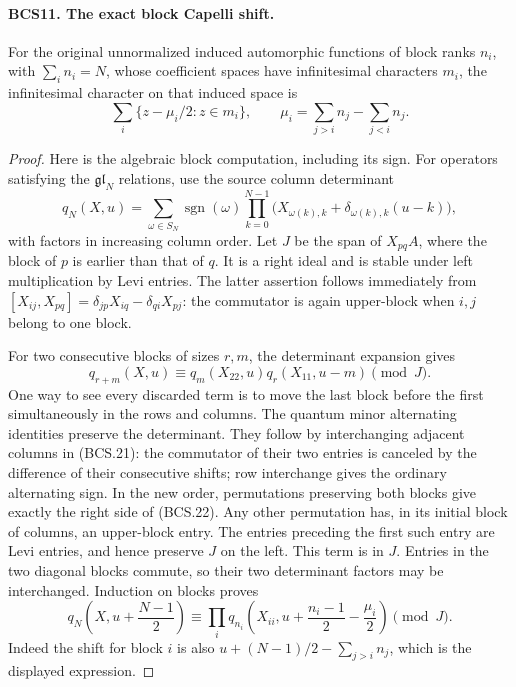 \paragraph{BCS11. The exact block Capelli shift.}
\label{claim:BCS11}
For the original unnormalized induced automorphic functions of block
ranks \(n_i\), with \(\sum_i n_i=N\), whose coefficient spaces
have infinitesimal characters \(m_i\), the infinitesimal character
on that induced space is
\[
       \sum_i\{z-\mu_i/2:z\in m_i\},\qquad
       \mu_i=\sum_{j>i}n_j-\sum_{j<i}n_j.
 \tag{BCS.20}
\]
\begin{proof}
Here is the algebraic block computation, including its sign.
For operators satisfying the \(\mathfrak{gl}_N\) relations, use
the source column determinant
\[
 q_N(X,u)=\sum_{\omega\in S_N}\operatorname{sgn}(\omega)
       \prod_{k=0}^{N-1}
       \bigl(X_{\omega(k),k}+\delta_{\omega(k),k}(u-k)\bigr),
 \tag{BCS.21}
\]
with factors in increasing column order.  Let \(J\) be the span
of \(X_{pq}A\), where the block of \(p\) is earlier than that of
\(q\).  It is a right ideal and is stable under left multiplication
by Levi entries.  The latter assertion follows immediately from
\([X_{ij},X_{pq}]=\delta_{jp}X_{iq}-\delta_{qi}X_{pj}\): the
commutator is again upper-block when \(i,j\) belong to one block.

For two consecutive blocks of sizes \(r,m\), the determinant
expansion gives
\[
 q_{r+m}(X,u)\equiv
       q_m(X_{22},u)q_r(X_{11},u-m)\pmod J.
 \tag{BCS.22}
\]
One way to see every discarded term is to move the last block before
the first simultaneously in the rows and columns.  The quantum
minor alternating identities preserve the determinant.  They follow
by interchanging adjacent columns in (BCS.21): the commutator of
their two entries is canceled by the difference of their consecutive
shifts; row interchange gives the ordinary alternating sign.  In the
new order, permutations preserving both blocks give exactly the
right side of (BCS.22).  Any other permutation has, in its initial
block of columns, an upper-block entry.  The entries preceding the
first such entry are Levi entries, and hence preserve \(J\) on the
left.  This term is in \(J\).  Entries in the two diagonal blocks
commute, so their two determinant factors may be interchanged.
Induction on blocks proves
\[
 q_N\!\left(X,u+\frac{N-1}{2}\right)
 \equiv\prod_i q_{n_i}\!\left(X_{ii},
           u+\frac{n_i-1}{2}-\frac{\mu_i}{2}\right)\pmod J.
 \tag{BCS.23}
\]
Indeed the shift for block \(i\) is also
\(u+(N-1)/2-\sum_{j>i}n_j\), which is the displayed expression.


\end{proof}
